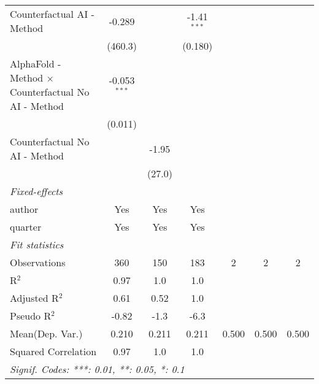 \begin{tabular}{lcccccc}
   Counterfactual AI - Method                                 & -0.289         &               & -1.41$^{***}$  &     &     &   \\   
                                                              & (460.3)        &               & (0.180)        &     &     &   \\   
   AlphaFold - Method $\times$ Counterfactual No AI - Method  & -0.053$^{***}$ &               &                &     &     &   \\   
                                                              & (0.011)        &               &                &     &     &   \\   
   Counterfactual No AI - Method                              &                & -1.95         &                &     &     &   \\   
                                                              &                & (27.0)        &                &     &     &   \\   
   \midrule
   \emph{Fixed-effects}\\
   author                                                     & Yes            & Yes           & Yes            &     &     & \\  
   quarter                                                    & Yes            & Yes           & Yes            &     &     & \\  
   \midrule
   \emph{Fit statistics}\\
   Observations                                               & 360            & 150           & 183            & 2   & 2   & 2\\  
   R$^2$                                                      & 0.97           & 1.0           & 1.0            &     &     & \\  
   Adjusted R$^2$                                             & 0.61           & 0.52          & 1.0            &     &     & \\  
   Pseudo R$^2$                                               & -0.82          & -1.3          & -6.3           &     &     & \\  
Mean(Dep. Var.) & 0.210 & 0.211 & 0.211 & 0.500 & 0.500 & 0.500 \\
   Squared Correlation                                        & 0.97           & 1.0           & 1.0            &     &     & \\  
   \midrule \midrule
   \multicolumn{7}{l}{\emph{Signif. Codes: ***: 0.01, **: 0.05, *: 0.1}}\\
\end{tabular}
\par\endgroup
